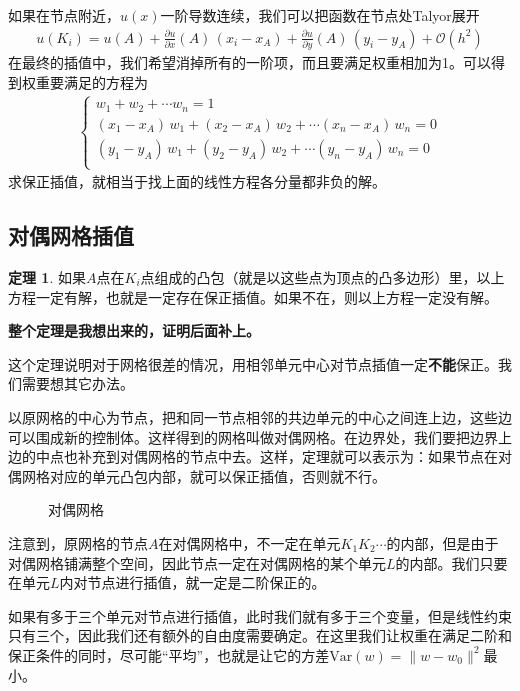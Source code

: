 \documentclass[12pt,a4paper]{article}
\theoremstyle{definition}
\newtheorem{theorem}{定理}
\begin{document}
如果在节点附近，$u(x)$一阶导数连续，我们可以把函数在节点处Talyor展开
\begin{align*}
u(K_i) = u(A) + \frac{\partial u}{\partial x}(A) \, (x_i - x_A) + \frac{\partial u}{\partial y}(A) \, (y_i - y_A) + \mathcal{O}(h^2)
\end{align*}
在最终的插值中，我们希望消掉所有的一阶项，而且要满足权重相加为1。可以得到权重要满足的方程为
\begin{align*}
\left\{\begin{array}{l}
w_1 + w_2 + \cdots w_n = 1 \\
(x_1 - x_A) \, w_1 + (x_2 - x_A) \, w_2 + \cdots (x_n - x_A) \, w_n = 0 \\
(y_1 - y_A) \, w_1 + (y_2 - y_A) \, w_2 + \cdots (y_n - y_A) \, w_n = 0 \\
\end{array}\right.
\end{align*}
求保正插值，就相当于找上面的线性方程各分量都非负的解。

\subsection{对偶网格插值}

\begin{theorem}
如果$A$点在$K_i$点组成的凸包（就是以这些点为顶点的凸多边形）里，以上方程一定有解，也就是一定存在保正插值。如果不在，则以上方程一定没有解。
\end{theorem}
\textbf{整个定理是我想出来的，证明后面补上。}

这个定理说明对于网格很差的情况，用相邻单元中心对节点插值一定\textbf{不能}保正。我们需要想其它办法。

以原网格的中心为节点，把和同一节点相邻的共边单元的中心之间连上边，这些边可以围成新的控制体。这样得到的网格叫做对偶网格。在边界处，我们要把边界上边的中点也补充到对偶网格的节点中去。这样，定理就可以表示为：如果节点在对偶网格对应的单元凸包内部，就可以保正插值，否则就不行。

\begin{figure}[h]
\centering
\caption{对偶网格}
\label{f2}
\end{figure}

注意到，原网格的节点$A$在对偶网格中，不一定在单元$K_1 K_2 \cdots$的内部，但是由于对偶网格铺满整个空间，因此节点一定在对偶网格的某个单元$L$的内部。我们只要在单元$L$内对节点进行插值，就一定是二阶保正的。

如果有多于三个单元对节点进行插值，此时我们就有多于三个变量，但是线性约束只有三个，因此我们还有额外的自由度需要确定。在这里我们让权重在满足二阶和保正条件的同时，尽可能“平均”，也就是让它的方差$\mathrm{Var}(w) = \|w - w_0\|^2$最小。
\end{document}
